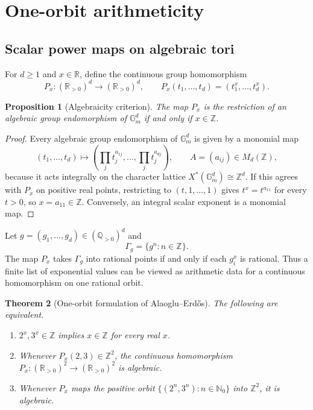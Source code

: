 \documentclass[11pt,oneside]{article}
\newtheorem{theorem}{Theorem}[section]
\newtheorem{proposition}[theorem]{Proposition}
\theoremstyle{definition}
\newcommand{\Q}{\mathbb{Q}}
\newcommand{\R}{\mathbb{R}}
\newcommand{\Z}{\mathbb{Z}}
\newcommand{\N}{\mathbb{N}}
\newcommand{\Gm}{\mathbb{G}_{m}}
\begin{document}
\section{One-orbit arithmeticity}

\subsection{Scalar power maps on algebraic tori}

For $d\ge1$ and $x\in\R$, define the continuous group homomorphism
\[
       P_x:(\R_{>0})^d\longrightarrow(\R_{>0})^d,
       \qquad
       P_x(t_1,\ldots,t_d)=(t_1^x,\ldots,t_d^x).
\]

\begin{proposition}[Algebraicity criterion]\label{prop:algebraic-power}
The map $P_x$ is the restriction of an algebraic group endomorphism of $\Gm^d$ if and only if $x\in\Z$.
\end{proposition}

\begin{proof}
Every algebraic group endomorphism of $\Gm^d$ is given by a monomial map
\[
   (t_1,\ldots,t_d)\longmapsto
   \left(\prod_jt_j^{a_{1j}},\ldots,
         \prod_jt_j^{a_{dj}}\right),
   \qquad A=(a_{ij})\in M_d(\Z),
\]
because it acts integrally on the character lattice $X^*(\Gm^d)\cong\Z^d$.  If this agrees with $P_x$ on positive real points, restricting to $(t,1,\ldots,1)$ gives $t^x=t^{a_{11}}$ for every $t>0$, so $x=a_{11}\in\Z$.  Conversely, an integral scalar exponent is a monomial map.
\end{proof}

Let $g=(g_1,\ldots,g_d)\in(\Q_{>0})^d$ and
\[
       \Gamma_g=\{g^n:n\in\Z\}.
\]
The map $P_x$ takes $\Gamma_g$ into rational points if and only if each $g_i^x$ is rational.  Thus a finite list of exponential values can be viewed as arithmetic data for a continuous homomorphism on one rational orbit.

\begin{theorem}[One-orbit formulation of Alaoglu--Erd\H{o}s]\label{thm:oneorbit}
The following are equivalent.
\begin{enumerate}[label=\textup{(\alph*)}]
\item $2^x,3^x\in\Z$ implies $x\in\Z$ for every real $x$.
\item Whenever $P_x(2,3)\in\Z^2$, the continuous homomorphism $P_x:(\R_{>0})^2\to(\R_{>0})^2$ is algebraic.
\item Whenever $P_x$ maps the positive orbit $\{(2^n,3^n):n\in\N_0\}$ into $\Z^2$, it is algebraic.
\end{enumerate}
\end{theorem}
\end{document}
